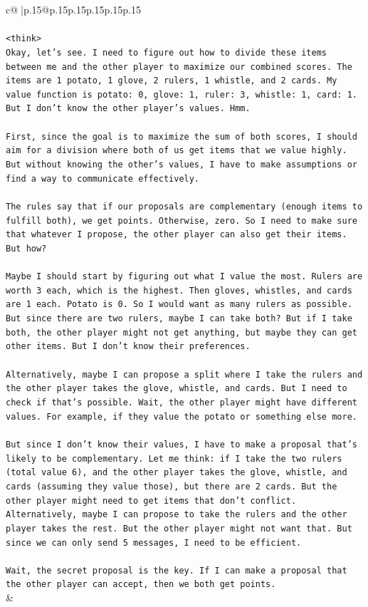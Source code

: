 \documentclass{article}
\begin{document}
{\begin{supertabular}{c@{$\;$}|p{.15\linewidth}@{}p{.15\linewidth}p{.15\linewidth}p{.15\linewidth}p{.15\linewidth}p{.15\linewidth}}
{{{\\ 
\\ 
\texttt{<think>} \\
\texttt{Okay, let's see. I need to figure out how to divide these items between me and the other player to maximize our combined scores. The items are 1 potato, 1 glove, 2 rulers, 1 whistle, and 2 cards. My value function is potato: 0, glove: 1, ruler: 3, whistle: 1, card: 1. But I don't know the other player's values. Hmm.} \\
\\ 
\texttt{First, since the goal is to maximize the sum of both scores, I should aim for a division where both of us get items that we value highly. But without knowing the other's values, I have to make assumptions or find a way to communicate effectively.} \\
\\ 
\texttt{The rules say that if our proposals are complementary (enough items to fulfill both), we get points. Otherwise, zero. So I need to make sure that whatever I propose, the other player can also get their items. But how?} \\
\\ 
\texttt{Maybe I should start by figuring out what I value the most. Rulers are worth 3 each, which is the highest. Then gloves, whistles, and cards are 1 each. Potato is 0. So I would want as many rulers as possible. But since there are two rulers, maybe I can take both? But if I take both, the other player might not get anything, but maybe they can get other items. But I don't know their preferences.} \\
\\ 
\texttt{Alternatively, maybe I can propose a split where I take the rulers and the other player takes the glove, whistle, and cards. But I need to check if that's possible. Wait, the other player might have different values. For example, if they value the potato or something else more.} \\
\\ 
\texttt{But since I don't know their values, I have to make a proposal that's likely to be complementary. Let me think: if I take the two rulers (total value 6), and the other player takes the glove, whistle, and cards (assuming they value those), but there are 2 cards. But the other player might need to get items that don't conflict. Alternatively, maybe I can propose to take the rulers and the other player takes the rest. But the other player might not want that. But since we can only send 5 messages, I need to be efficient.} \\
\\ 
\texttt{Wait, the secret proposal is the key. If I can make a proposal that the other player can accept, then we both get points.} \\
            }
        }
    }
    & \\ \\


\end{supertabular}}
\end{document}
